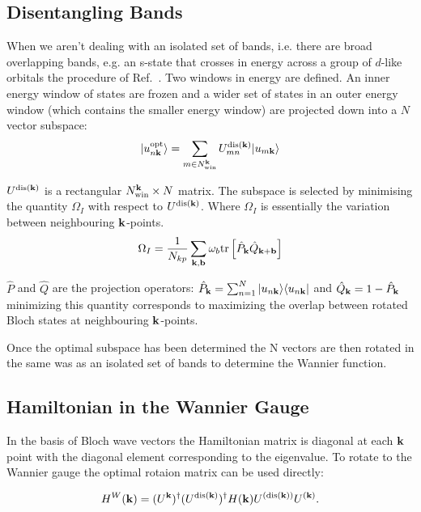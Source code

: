 \subsection{Disentangling Bands}
When we aren't dealing with an isolated set of bands, i.e.
there are broad overlapping bands, e.g. an s-state that crosses in energy
across a group of $d$-like orbitals the procedure of Ref.~\cite{souza02}.
Two windows in energy are defined. An inner energy window of states are frozen 
and a wider set of states in an outer energy window (which contains the smaller
energy window) are projected down into a $N$ vector subspace:
%
\begin{equation}
|u^{\rm opt}_{n{\bf k}}\rangle = \sum_{m \in N_{\rm win}^{{\bf k}}} U_{mn}^{{\rm dis}({\bf k})}|u_{m{\bf k}}\rangle
\end{equation}
%

$U^{{\rm dis}({\bf k})}$ is a rectangular $N_{\rm win}^{{\bf k}} \times N$ matrix. 
The subspace is selected by minimising the quantity $\Omega_{I}$ with respect to $U^{{\rm dis}({\bf k})}$.
Where $\Omega_{I}$ is essentially the variation between neighbouring ${\bf k}$-points. 
%
\begin{equation}
\Omega_{I} = \frac{1}{N_{kp}} \sum_{{\bf k}, \mathbf{b}} \omega_{b} {\rm tr} \left[\hat{P}_{{\bf k}}\hat{Q}_{{\bf k}+\mathbf{b}}\right]
\end{equation}

$\hat{P}$ and $\hat{Q}$ are the projection operators: 
$\hat{P}_{{\bf k}}=\sum_{n=1}^{N}|u_{n{\bf k}}\rangle \langle u_{n{\bf k}}|$ and $\hat{Q}_{{\bf k}} = 1-\hat{P}_{{\bf k}}$
minimizing this quantity corresponds to maximizing the overlap between rotated Bloch
states at neighbouring ${\bf k}$-points.

Once the optimal subspace has been determined the N vectors are then rotated in the same
was as an isolated set of bands to determine the Wannier function.

\subsection{Hamiltonian in the Wannier Gauge}
In the basis of Bloch wave vectors the Hamiltonian matrix is diagonal at each ${\bf k}$ point
with the diagonal element corresponding to the eigenvalue. To rotate to the 
Wannier gauge the optimal rotaion matrix can be used directly:

\begin{equation}
\label{eq:HWan}
H^{W}({\bf k}) = (U^{{\bf k}})^{\dagger}(U^{{\rm dis}({\bf k})})^{\dagger}H({\bf k})U^{({\rm dis}({\bf k}))}U^{({\bf k})}.
\end{equation}

